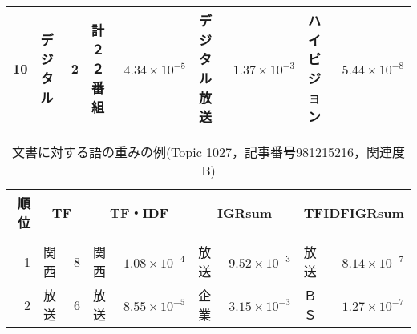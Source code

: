 \begin{table}[htbp]
\begin{center}
\begin{tabular}{|r|ll|ll|ll|ll|}
  10	  & デジタル & \hspace{-2mm}2\hspace{-1.0mm}	  & 計２２番組 & \hspace{-2mm}$4.34\times 10^{-5}$\hspace{-1.5mm} & デジタル放送 & \hspace{-2mm}$1.37\times 10^{-3}$\hspace{-1.5mm} & ハイビジョン & \hspace{-2mm}$5.44\times 10^{-8}$\hspace{-1.5mm} \\
  \hline
\end{tabular}
\end{center}
\end{table}
\begin{table}[htbp]
\caption{文書に対する語の重みの例(Topic 1027，記事番号981215216，関連度B)}
\label{Table:weight1027B}
\footnotesize
\begin{center}
\begin{tabular}{|r|ll|ll|ll|ll|}
  \hline
  \hspace{-1mm}順位\hspace{-1mm}	  & \multicolumn{2}{c|}{TF}& \multicolumn{2}{c|}{TF・IDF} & \multicolumn{2}{c|}{IGRsum} & \multicolumn{2}{c|}{TFIDFIGRsum}\\
  \hline
& & & & & & & & \\[-8pt]
  1	  & 関西     & \hspace{-2mm}8\hspace{-1.0mm} & 関西           & \hspace{-2mm}$1.08\times 10^{-4}$\hspace{-1.5mm} & 放送       & \hspace{-2mm}$9.52\times 10^{-3}$\hspace{-1.5mm} & 放送       & \hspace{-2mm}$8.14\times 10^{-7}$\hspace{-1.5mm} \\
  2	  & 放送     & \hspace{-2mm}6\hspace{-1.0mm} & 放送           & \hspace{-2mm}$8.55\times 10^{-5}$\hspace{-1.5mm} & 企業       & \hspace{-2mm}$3.15\times 10^{-3}$\hspace{-1.5mm} & ＢＳ       & \hspace{-2mm}$1.27\times 10^{-7}$\hspace{-1.5mm} \\

\end{tabular}
\end{center}
\end{table}
